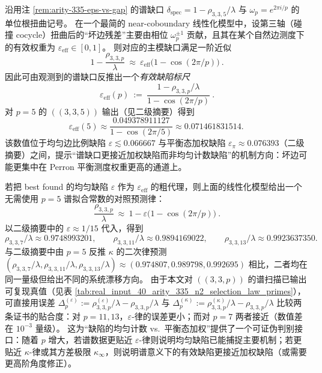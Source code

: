 \begin{corollary}\label{cor:arity-335-eps-eff-inversion}
沿用注 \ref{rem:arity-335-eps-vs-gap} 的谱缺口
\(
\delta_{\mathrm{spec}}=1-\rho_{3,3,5}/\lambda
\)
与 \(\omega_p=e^{2\pi i/p}\) 的单位根扭曲记号。
在一个最简的 near-coboundary 线性化模型中，设第三轴（碰撞 cocycle）扭曲后的“坏边残差”主要由相位 \(\omega_p^{\pm1}\) 贡献，且其在某个自然边测度下的有效权重为 \(\varepsilon_{\mathrm{eff}}\in[0,1]\)。
则对应的主模缺口满足一阶近似
$$
\boxed{\ 
1-\frac{\rho_{3,3,p}}{\lambda}
\ \approx\ 
\varepsilon_{\mathrm{eff}}\bigl(1-\cos(2\pi/p)\bigr)\ }.
$$
因此可由观测到的谱缺口反推出一个\emph{有效缺陷标尺}
$$
\boxed{\ 
\varepsilon_{\mathrm{eff}}(p)
\ :=\
\frac{1-\rho_{3,3,p}/\lambda}{1-\cos(2\pi/p)}\ }.
$$
对 \(p=5\) 的 \(((3,3,5))\) 输出（见二级摘要）得到
$$
\varepsilon_{\mathrm{eff}}(5)\approx \frac{0.049378911127}{1-\cos(2\pi/5)}
\approx 0.071461831514.
$$
该数值位于均匀边比例缺陷 \(\varepsilon\lesssim 0.066667\) 与平衡态加权缺陷 \(\varepsilon_\pi\approx 0.076393\)（二级摘要）之间，提示“谱缺口更接近加权缺陷而非均匀计数缺陷”的机制方向：坏边可能更集中在 Perron 平衡测度权重更高的通道上。
\end{corollary}

\begin{remark}\label{rem:arity-335-eps-law-prediction}
若把 best found 的均匀缺陷 \(\varepsilon\) 作为 \(\varepsilon_{\mathrm{eff}}\) 的粗代理，则上面的线性化模型给出一个无需使用 \(p=5\) 谱拟合常数的对照预测律：
$$
\boxed{\
\frac{\rho_{3,3,p}}{\lambda}
\ \approx\
1-\varepsilon\bigl(1-\cos(2\pi/p)\bigr)\ }.
$$
以二级摘要中的 \(\varepsilon\approx 1/15\) 代入，得到
$$
\rho_{3,3,7}/\lambda\approx 0.9748993201,\qquad
\rho_{3,3,11}/\lambda\approx 0.9894169022,\qquad
\rho_{3,3,13}/\lambda\approx 0.9923637350.
$$
与二级摘要中由 \(p=5\) 反推 \(\kappa\) 的二次律预测
\(
(\rho_{3,3,7}/\lambda,\rho_{3,3,11}/\lambda,\rho_{3,3,13}/\lambda)\approx
(0.974807,0.989798,0.992695)
\)
相比，二者均在同一量级但给出不同的系统漂移方向。
由于本文对 \(((3,3,p))\) 的谱扫描已输出可复现真值（见表 \ref{tab:real_input_40_arity_335_n2_selection_law_primes}），可直接用误差
\(
\Delta_p^{(\varepsilon)}:=\rho_{3,3,p}^{(\varepsilon)}/\lambda-\rho_{3,3,p}/\lambda
\)
与
\(
\Delta_p^{(\kappa)}:=\rho_{3,3,p}^{(\kappa)}/\lambda-\rho_{3,3,p}/\lambda
\)
比较两条证书的贴合度：对 \(p=11,13\)，\(\varepsilon\)-律的误差更小；而对 \(p=7\) 两者接近（数值差在 \(10^{-3}\) 量级）。
这为“缺陷的均匀计数 vs.\ 平衡态加权”提供了一个可证伪判别接口：随着 \(p\) 增大，若谱数据更贴近 \(\varepsilon\)-律则说明均匀缺陷已能捕捉主要机制；若更贴近 \(\kappa\)-律或其方差极限 \(\kappa_\infty\)，则说明谱意义下的有效缺陷更接近加权缺陷（或需要更高阶角度修正）。
\end{remark}

